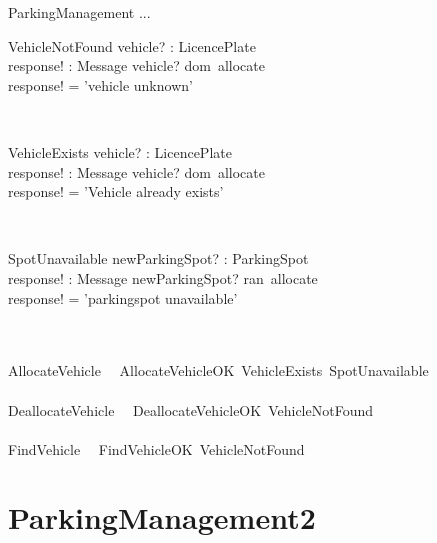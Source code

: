 \documentclass[12pt]{article}
\begin{document}
\begin{spacing}{1.5}
\newpage

\begin{class}{ParkingManagement}
\also
... \\
\begin{op}{VehicleNotFound}
vehicle? : LicencePlate\\
response! : Message
\ST
vehicle? \notin dom~allocate\\
response! =\: 'vehicle \: unknown'
\end{op}\\
\begin{op}{VehicleExists}
vehicle? : LicencePlate\\
response! : Message
\ST
vehicle? \in dom~allocate\\
response! =\: 'Vehicle \: already \: exists'
\end{op}\\
\begin{op}{SpotUnavailable}
newParkingSpot? : ParkingSpot\\
response! : Message
\ST
newParkingSpot? \in ran~allocate\\
response! =\: 'parkingspot \: unavailable'\\
\end{op}\\
~\\
AllocateVehicle \, \hat{=} \, AllocateVehicleOK \,\vee VehicleExists \,\vee SpotUnavailable\\
~\\
DeallocateVehicle \, \hat{=} \, DeallocateVehicleOK \,\vee VehicleNotFound\\
~\\
FindVehicle  \, \hat{=} \, FindVehicleOK \,\vee VehicleNotFound\\
\end{class}


\newpage

\section{ParkingManagement2}


\end{spacing}
\end{document}
